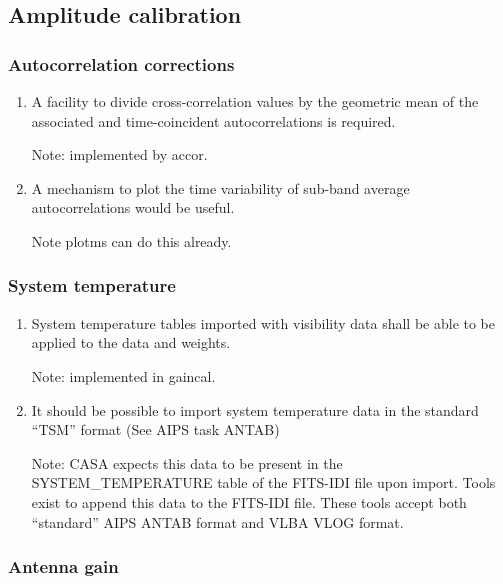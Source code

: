 \documentclass[11pt,a4paper]{article}
\begin{document}
\subsection{Amplitude calibration}

\subsubsection{Autocorrelation corrections}

\begin{enumerate}[subsubseclist]

\item A facility to divide cross-correlation values by the geometric
  mean of the associated and time-coincident autocorrelations is
  required.

  Note: implemented by accor.

\item A mechanism to plot the time variability of sub-band average
  autocorrelations would be useful.

  Note plotms can do this already.
  
\end{enumerate}

\subsubsection{System temperature}

\begin{enumerate}[subsubseclist]

  \item System temperature tables imported with visibility data shall
    be able to be applied to the data and weights.

    Note: implemented in gaincal.

  \item It should be possible to import system temperature data in the
    standard ``TSM'' format (See AIPS task ANTAB)

    Note: CASA expects this data to be present in the
    SYSTEM\_TEMPERATURE table of the FITS-IDI file upon import.  Tools
    exist to append this data to the FITS-IDI file.  These tools
    accept both ``standard'' AIPS ANTAB format and VLBA VLOG format.

\end{enumerate}


\subsubsection{Antenna gain}
\end{document}
